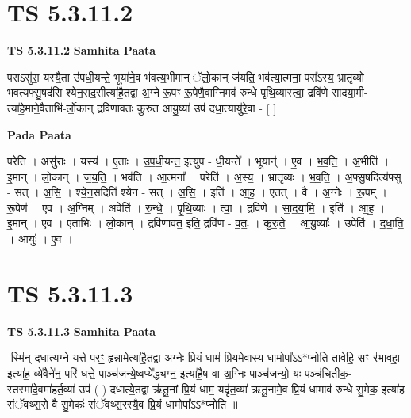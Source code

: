 \documentclass[17pt]{extarticle}
\begin{document}
\section*{ TS 5.3.11.2 }

\textbf{TS 5.3.11.2 } \newline
\textbf{Samhita Paata} \newline

पराऽसु॑रा॒ यस्यै॒ता उ॑पधी॒यन्ते॒ भूया॑ने॒व भ॑वत्य॒भीमान् ॅलो॒कान् ज॑यति॒ भव॑त्या॒त्मना॒ परा᳚ऽस्य॒ भ्रातृ॑व्यो भवत्यफ्सु॒षद॑सि श्येन॒सद॒सीत्या॑है॒तद्वा अ॒ग्ने रू॒पꣳ रू॒पेणै॒वाग्निमव॑ रुन्धे पृथि॒व्यास्त्वा॒ द्रवि॑णे सादया॒मी-त्या॑हे॒माने॒वैताभि॑-र्लो॒कान् द्रवि॑णावतः कुरुत आयु॒ष्या॑ उप॑ दधा॒त्यायु॑रे॒वा - [  ] \newline

\textbf{Pada Paata} \newline

परेति॑ । असु॑राः । यस्य॑ । ए॒ताः । उ॒प॒धी॒यन्त॒ इत्यु॑प - धी॒यन्ते᳚ । भूयान्॑ । ए॒व । भ॒व॒ति॒ । अ॒भीति॑ । इ॒मान् । लो॒कान् । ज॒य॒ति॒ । भव॑ति । आ॒त्मना᳚ । परेति॑ । अ॒स्य॒ । भ्रातृ॑व्यः । भ॒व॒ति॒ । अ॒फ्सु॒षदित्य॑फ्सु - सत् । अ॒सि॒ । श्ये॒न॒सदिति॑ श्येन - सत् । अ॒सि॒ । इति॑ । आ॒ह॒ । ए॒तत् । वै । अ॒ग्नेः । रू॒पम् । रू॒पेण॑ । ए॒व । अ॒ग्निम् । अवेति॑ । रु॒न्धे॒ । पृ॒थि॒व्याः । त्वा॒ । द्रवि॑णे । सा॒द॒या॒मि॒ । इति॑ । आ॒ह॒ । इ॒मान् । ए॒व । ए॒ताभिः॑ । लो॒कान् । द्रवि॑णावत॒ इति॒ द्रवि॑ण - व॒तः॒ । कु॒रु॒ते॒ । आ॒यु॒ष्याः᳚ । उपेति॑ । द॒धा॒ति॒ । आयुः॑ । ए॒व ।  \newline




\section*{ TS 5.3.11.3 }

\textbf{TS 5.3.11.3 } \newline
\textbf{Samhita Paata} \newline

-स्मि॑न् दधा॒त्यग्ने॒ यत्ते॒ परꣳ॒॒ हृन्नामेत्या॑है॒तद्वा अ॒ग्नेः प्रि॒यं धाम॑ प्रि॒यमे॒वास्य॒ धामोपा᳚ऽऽ*प्नोति॒ तावेहि॒ सꣳ र॑भावहा॒ इत्या॑ह॒ व्ये॑वैने॑न॒ परि॑ धत्ते॒ पाञ्च॑जन्ये॒ष्वप्ये᳚द्ध्यग्न॒ इत्या॑है॒ष वा अ॒ग्निः पाञ्च॑जन्यो॒ यः पञ्च॑चितीक॒-स्तस्मा॑दे॒वमा॑हर्त॒व्या॑ उप॑ ( ) दधात्ये॒तद्वा ऋ॑तू॒नां प्रि॒यं धाम॒ यदृ॑त॒व्या॑ ऋतू॒नामे॒व प्रि॒यं धामाव॑ रुन्धे सु॒मेक॒ इत्या॑ह संॅवथ्स॒रो वै सु॒मेकः॑ संॅवथ्स॒रस्यै॒व प्रि॒यं धामोपा᳚ऽऽ*प्नोति ॥ \newline
\end{document}
